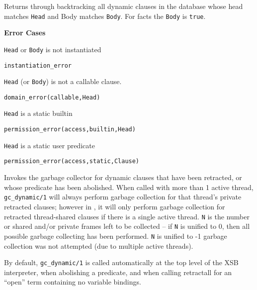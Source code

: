 \begin{description}
Returns through backtracking all dynamic clauses in the database whose head
matches {\tt Head} and Body matches {\tt Body}.  For facts the {\tt Body} is
{\tt true}.  

{\bf Error Cases}
\bi
\item 	{\tt Head} or {\tt Body} is not instantiated
\bi
\item 	{\tt instantiation\_error}
\ei
%
\item 	{\tt Head} (or {\tt Body}) is not a callable clause.
\bi
\item 	{\tt domain\_error(callable,Head)}
\ei
%
\item 	{\tt Head} is a static builtin
\bi
\item 	{\tt permission\_error(access,builtin,Head)}
\ei
\item 	{\tt Head} is a static user predicate
\bi
\item 	{\tt permission\_error(access,static,Clause)}
\ei
%
\ei

%
Invokes the garbage collector for dynamic clauses that have been
retracted, or whose predicate has been abolished.  When called with
more than 1 active thread, {\tt gc\_dynamic/1} will always perform
garbage collection for that thread's private retracted clauses;
however in \version{}, it will only perform garbage collection for
retracted thread-shared clauses if there is a single active thread.
{\tt N} is the number or shared and/or private frames left to be
collected -- if {\tt N} is unified to 0, then all possible garbage
collecting has been performed.  {\tt N} is unified to -1 garbage
collection was not attempted (due to multiple active threads).

By default, {\tt gc\_dynamic/1} is called automatically at the top
level of the XSB interpreter, when abolishing a predicate, and when
calling retractall for an ``open'' term containing no variable
bindings.

\end{description}

